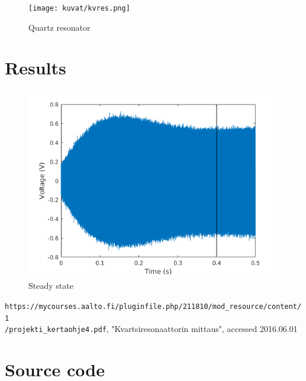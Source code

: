 \documentclass[12pt]{article}
\begin{document}
\begin{figure}
	\centering
	\texttt{[image: kuvat/kvres.png]}
	\caption{Quartz resonator}
	\label{fig:kvres}
\end{figure}

\section{Results}

\begin{figure}
	\centering
	\includegraphics[width = \textwidth]{kuvat/steadystate.png}
	\caption{Steady state}
	\label{fig:steady}
\end{figure}

\begin{thebibliography}{1}
 \texttt{https://mycourses.aalto.fi/pluginfile.php/211810/mod\_resource/content/1\\/projekti\_kertaohje4.pdf}, "Kvartsiresonaattorin mittaus", accessed 2016.06.01
\end{thebibliography}
\appendix

\section{Source code}


%
\end{document}
